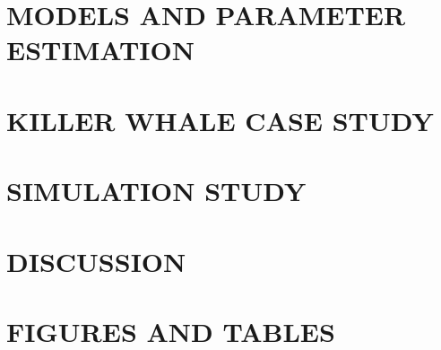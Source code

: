 \documentclass[12pt]{TD-CJS}
\begin{document}
\section{MODELS AND PARAMETER ESTIMATION}
\label{sec:models}

%
\section{KILLER WHALE CASE STUDY}
\label{sec:data}

%
\section{SIMULATION STUDY}
\label{sec:sim_study}

%
%
\section{DISCUSSION}

%
%
%
\newpage

%
\newpage
\begin{appendix}

\end{appendix}
%
\newpage
\section{FIGURES AND TABLES}

%
\end{document}
